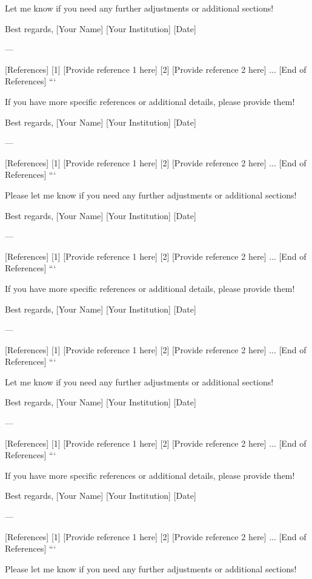 Let me know if you need any further adjustments or additional sections! 

Best regards,  
[Your Name]  
[Your Institution]  
[Date]  

--- 

[References]  
[1] [Provide reference 1 here]  
[2] [Provide reference 2 here]  
...  
[End of References]  
``` 

If you have more specific references or additional details, please provide them! 

Best regards,  
[Your Name]  
[Your Institution]  
[Date]  

--- 

[References]  
[1] [Provide reference 1 here]  
[2] [Provide reference 2 here]  
...  
[End of References]  
``` 

Please let me know if you need any further adjustments or additional sections! 

Best regards,  
[Your Name]  
[Your Institution]  
[Date]  

--- 

[References]  
[1] [Provide reference 1 here]  
[2] [Provide reference 2 here]  
...  
[End of References]  
``` 

If you have more specific references or additional details, please provide them! 

Best regards,  
[Your Name]  
[Your Institution]  
[Date]  

--- 

[References]  
[1] [Provide reference 1 here]  
[2] [Provide reference 2 here]  
...  
[End of References]  
``` 

Let me know if you need any further adjustments or additional sections! 

Best regards,  
[Your Name]  
[Your Institution]  
[Date]  

--- 

[References]  
[1] [Provide reference 1 here]  
[2] [Provide reference 2 here]  
...  
[End of References]  
``` 

If you have more specific references or additional details, please provide them! 

Best regards,  
[Your Name]  
[Your Institution]  
[Date]  

--- 

[References]  
[1] [Provide reference 1 here]  
[2] [Provide reference 2 here]  
...  
[End of References]  
``` 

Please let me know if you need any further adjustments or additional sections! 

